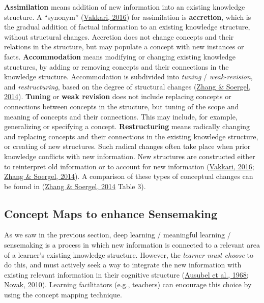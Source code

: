 \documentclass[letterpaper, nobind]{templates/ociamthesis}
\begin{document}
\textbf{Assimilation} means addition of new information into an existing
knowledge structure. A ``synonym'' (\protect\hyperlink{ref-vakkari2016searching}{Vakkari, 2016}) for
assimilation is \textbf{accretion}, which is the gradual addition of factual
information to an existing knowledge structure, without structural
changes. Accretion does not change concepts and their relations in the
structure, but may populate a concept with new instances or facts.
\textbf{Accommodation} means modifying or changing existing knowledge
structures, by adding or removing concepts and their connections in the
knowledge structure. Accommodation is subdivided into \emph{tuning} /
\emph{weak-revision}, and \emph{restructuring}, based on the degree of structural
changes (\protect\hyperlink{ref-zhang2014towards}{Zhang \& Soergel, 2014}). \textbf{Tuning} or \textbf{weak revision} does not
include replacing concepts or connections between concepts in the
structure, but tuning of the scope and meaning of concepts and their
connections. This may include, for example, generalizing or specifying a
concept. \textbf{Restructuring} means radically changing and replacing
concepts and their connections in the existing knowledge structure, or
creating of new structures. Such radical changes often take place when
prior knowledge conflicts with new information. New structures are
constructed either to reinterpret old information or to account for new
information (\protect\hyperlink{ref-vakkari2016searching}{Vakkari, 2016}; \protect\hyperlink{ref-zhang2014towards}{Zhang \& Soergel, 2014}). A comparison of
these types of conceptual changes can be found in (\protect\hyperlink{ref-zhang2014towards}{Zhang \& Soergel, 2014} Table 3).

\hypertarget{sec-bg-concept-maps}{%
\subsection{Concept Maps to enhance Sensemaking}\label{sec-bg-concept-maps}}

As we saw in the previous section, deep learning / meaningful learning /
sensemaking is a process in which new information is connected to a
relevant area of a learner's existing knowledge structure. However, the
\emph{learner must choose} to do this, and must actively seek a way to
integrate the new information with existing relevant information in
their cognitive structure
(\protect\hyperlink{ref-ausubel1968educational}{Ausubel et al., 1968}; \protect\hyperlink{ref-novak2010learninga}{Novak, 2010}). Learning facilitators
(e.g., teachers) can encourage this choice by using the concept mapping
technique.
\end{document}
